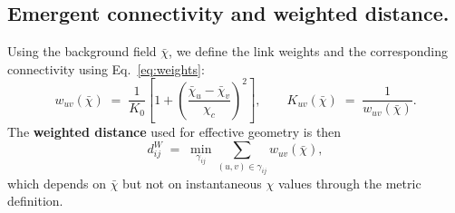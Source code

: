 \subsection{Emergent connectivity and weighted distance.}
  \label{subsec:emergent-connectivity-and-weighted-distance}
  Using the background field $\bar{\chi}$, we define the link weights and the corresponding
  connectivity using Eq.~\eqref{eq:weights}:
  \[
    w_{uv}(\bar{\chi})
    \;=\;
    \frac{1}{K_0}
    \left[
      1 + \left(\frac{\bar{\chi}_u-\bar{\chi}_v}{\chi_c}\right)^2
    \right],
    \qquad
    K_{uv}(\bar{\chi}) \;=\; \frac{1}{w_{uv}(\bar{\chi})}.
  \]
  The \textbf{weighted distance} used for effective geometry is then
  \begin{equation}
    d_{ij}^{W}
    \;=\;
    \min_{\gamma_{ij}}
    \sum_{(u,v)\in\gamma_{ij}} w_{uv}(\bar{\chi}),
    \label{eq:weighted_distance}
  \end{equation}
  which depends on $\bar{\chi}$ but not on instantaneous $\chi$ values through the metric definition.
